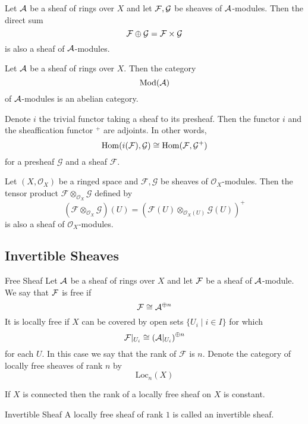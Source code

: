 \documentclass[a4paper]{article}
\begin{document}
\begin{prp}{}{} Let $\mathcal{A}$ be a sheaf of rings over $X$ and let $\mathcal{F},\mathcal{G}$ be sheaves of $\mathcal{A}$-modules. Then the direct sum $$\mathcal{F}\oplus\mathcal{G}=\mathcal{F}\times\mathcal{G}$$ is also a sheaf of $\mathcal{A}$-modules. 
\end{prp}

\begin{thm}{}{} Let $\mathcal{A}$ be a sheaf of rings over $X$. Then the category $$\text{Mod}(\mathcal{A})$$ of $\mathcal{A}$-modules is an abelian category. 
\end{thm}

\begin{prp}{}{} Denote $i$ the trivial functor taking a sheaf to its presheaf. Then the functor $i$ and the sheaffication functor $^+$ are adjoints. In other words, $$\operatorname{Hom}(i(\mathcal{F}),\mathcal{G})\cong\operatorname{Hom}(\mathcal{F},\mathcal{G}^+)$$ for a presheaf $\mathcal{G}$ and a sheaf $\mathcal{F}$. 
\end{prp}

\begin{prp}{}{} Let $(X,\mathcal{O}_X)$ be a ringed space and $\mathcal{F},\mathcal{G}$ be sheaves of $\mathcal{O}_X$-modules. Then the tensor product $\mathcal{F}\otimes_{\mathcal{O}_X}\mathcal{G}$ defined by $$(\mathcal{F}\otimes_{\mathcal{O}_X}\mathcal{G})(U)=(\mathcal{F}(U)\otimes_{\mathcal{O}_X(U)}\mathcal{G}(U))^+$$ is also a sheaf of $\mathcal{O}_X$-modules. 
\end{prp}

\subsection{Invertible Sheaves}
\begin{defn}{Free Sheaf}{} Let $\mathcal{A}$ be a sheaf of rings over $X$ and let $\mathcal{F}$ be a sheaf of $\mathcal{A}$-module. We say that $\mathcal{F}$ is free if $$\mathcal{F}\cong\mathcal{A}^{\oplus n}$$ It is locally free if $X$ can be covered by open sets $\{U_i\;|\;i\in I\}$ for which $$\mathcal{F}|_{U_i}\cong\left(\mathcal{A}|_{U_i}\right)^{\oplus n}$$ for each $U$. In this case we say that the rank of $\mathcal{F}$ is $n$. Denote the category of locally free sheaves of rank $n$ by $$\text{Loc}_n(X)$$
\end{defn}

\begin{lmm}{}{} If $X$ is connected then the rank of a locally free sheaf on $X$ is constant. 
\end{lmm}

\begin{defn}{Invertible Sheaf}{} A locally free sheaf of rank $1$ is called an invertible sheaf. 
\end{defn}
\end{document}
